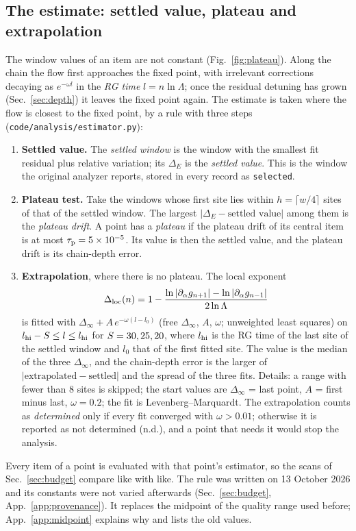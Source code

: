 \documentclass[10pt,a4paper]{article}
\newcommand{\DE}{\Delta_E}
\newcommand{\Dloc}{\Delta_{\rm loc}}
\newcommand{\code}[1]{\texttt{#1}}
\begin{document}
\subsection{The estimate: settled value, plateau and extrapolation}\label{sec:estimator}
The window values of an item are not constant (Fig.~\ref{fig:plateau}). Along the chain the flow first approaches the fixed point,
with irrelevant corrections decaying as $e^{-\omega l}$ in the \emph{RG time} $l=n\ln\Lambda$; once the residual detuning has grown
(Sec.~\ref{sec:depth}) it leaves the fixed point again. The estimate is taken where the flow is closest to the fixed point, by a rule
with three steps (\code{code/analysis/estimator.py}):
\begin{enumerate}
\item \textbf{Settled value.} The \emph{settled window} is the window with the smallest fit residual plus relative variation; its
  $\DE$ is the \emph{settled value}. This is the window the original analyzer reports, stored in every record as \code{selected}.
\item \textbf{Plateau test.} Take the windows whose first site lies within $h=\lceil w/4\rceil$ sites of that of the settled window.
  The largest $|\DE-\text{settled value}|$ among them is the \emph{plateau drift}. A point has a \emph{plateau} if the plateau drift
  of its central item is at most $\tau_{\rm p}=5\times10^{-5}$. Its value is then the settled value, and the plateau drift is its chain-depth
  error.
\item \textbf{Extrapolation}, where there is no plateau. The local exponent
  \begin{equation}
  \Dloc(n)=1-\frac{\ln|\partial_\alpha g_{n+1}|-\ln|\partial_\alpha g_{n-1}|}{2\ln\Lambda}\label{eq:loc}
  \end{equation}
  is fitted with $\Delta_\infty+A\,e^{-\omega(l-l_0)}$ (free $\Delta_\infty$, $A$, $\omega$; unweighted least squares) on
  $l_{\rm hi}-S\le l\le l_{\rm hi}$ for $S=30, 25, 20$, where $l_{\rm hi}$ is the RG time of the last site of the settled window and
  $l_0$ that of the first fitted site. The value is the median of the three $\Delta_\infty$, and the chain-depth error is the larger of
  $|\text{extrapolated}-\text{settled}|$ and the spread of the three fits. Details: a range with fewer than 8 sites is skipped; the
  start values are $\Delta_\infty$ = last point, $A$ = first minus last, $\omega=0.2$; the fit is Levenberg--Marquardt. The
  extrapolation counts as \emph{determined} only if every fit converged with $\omega>0.01$; otherwise it is reported as not
  determined (n.d.), and a point that needs it would stop the analysis.
\end{enumerate}
Every item of a point is evaluated with that point's estimator, so the scans of Sec.~\ref{sec:budget} compare like with like. The rule
was written on 13 October 2026 and its constants were not varied afterwards (Sec.~\ref{sec:budget}, App.~\ref{app:provenance}). It replaces the midpoint of
the quality range used before; App.~\ref{app:midpoint} explains why and lists the old values.
\end{document}
